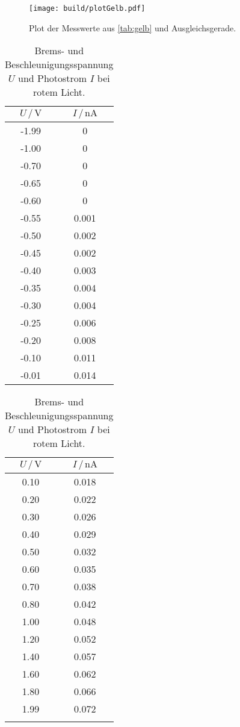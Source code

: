 \begin{figure}[H]
  \centering
  \texttt{[image: build/plotGelb.pdf]}
  \caption{Plot der Messwerte aus \autoref{tab:gelb} und Ausgleichsgerade.}
  \label{fig:plot_gelb}
\end{figure}

\begin{table}[H]
  \centering
  \caption{Brems- und Beschleunigungsspannung $U$ und Photostrom $I$ bei rotem Licht.}
  \begin{tabular}{|c|c|}
    \toprule
    $U \,/\, \si{\volt}$ & $I \,/\, \si{\nano\ampere}$\\
    \midrule
    -1.99 & 0\\
    -1.00 & 0\\
    -0.70 & 0\\
    -0.65 & 0\\
    -0.60 & 0\\
    -0.55 & 0.001\\
    -0.50 & 0.002\\
    -0.45 & 0.002\\
    -0.40 & 0.003\\
    -0.35 & 0.004\\
    -0.30 & 0.004\\
    -0.25 & 0.006\\
    -0.20 & 0.008\\
    -0.10 & 0.011\\
    -0.01 & 0.014\\
    \bottomrule
  \end{tabular}
  \begin{tabular}{|c|c|}
    \toprule
    $U \,/\, \si{\volt}$ & $I \,/\, \si{\nano\ampere}$\\
    \midrule
    0.10 & 0.018\\
    0.20 & 0.022\\
    0.30 & 0.026\\
    0.40 & 0.029\\
    0.50 & 0.032\\
    0.60 & 0.035\\
    0.70 & 0.038\\
    0.80 & 0.042\\
    1.00 & 0.048\\
    1.20 & 0.052\\
    1.40 & 0.057\\
    1.60 & 0.062\\
    1.80 & 0.066\\
    1.99 & 0.072\\
    \text{---} & \text{---}\\
    \bottomrule
  \end{tabular}
  \label{tab:rot}
\end{table}


